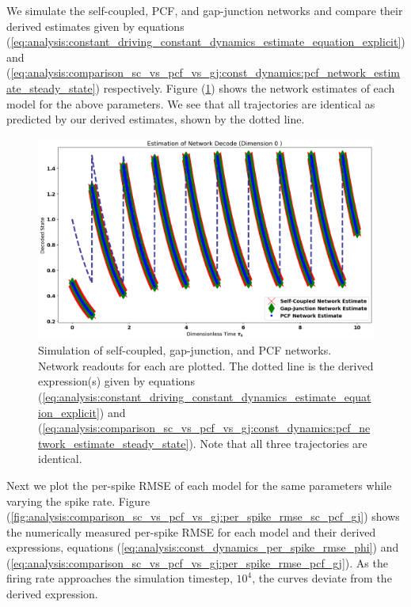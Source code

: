 We simulate the self-coupled, PCF, and gap-junction networks and compare their derived estimates given by equations (\ref{eq:analysis:constant_driving_constant_dynamics_estimate_equation_explicit}) and (\ref{eq:analysis:comparison_sc_vs_pcf_vs_gj:const_dynamics:pcf_network_estimate_steady_state}) respectively. 
Figure (\ref{fig:analysis:comparison_sc_vs_pcf_vs_gj:network_decode_sc_pcf_gj}) shows the network estimates of each model for the above parameters. We see that all trajectories are identical as predicted by our derived estimates, shown by the dotted line. 

\clearpage 

\begin{figure}
\centering
\includegraphics[width=\linewidth]{figures/const_dynamics_network_decode_comparison_sc_pcf_gj}
\caption{Simulation of self-coupled, gap-junction, and PCF networks. Network readouts for each are plotted. The dotted line is the derived expression(s) given by equations (\ref{eq:analysis:constant_driving_constant_dynamics_estimate_equation_explicit}) and (\ref{eq:analysis:comparison_sc_vs_pcf_vs_gj:const_dynamics:pcf_network_estimate_steady_state}). Note that all three trajectories are identical.}
\label{fig:analysis:comparison_sc_vs_pcf_vs_gj:network_decode_sc_pcf_gj}
\end{figure}

Next we plot the per-spike RMSE of each model for the same parameters while varying the spike rate. Figure (\ref{fig:analysis:comparison_sc_vs_pcf_vs_gj:per_spike_rmse_sc_pcf_gj}) shows the numerically measured per-spike RMSE for each model and their derived expressions, equations (\ref{eq:analysis:const_dynamics_per_spike_rmse_phi}) and (\ref{eq:analysis:comparison_sc_vs_pcf_vs_gj:per_spike_rmse_pcf_gj}). As the firing rate approaches the simulation timestep, $10^4$, the curves deviate from the derived expression. 

